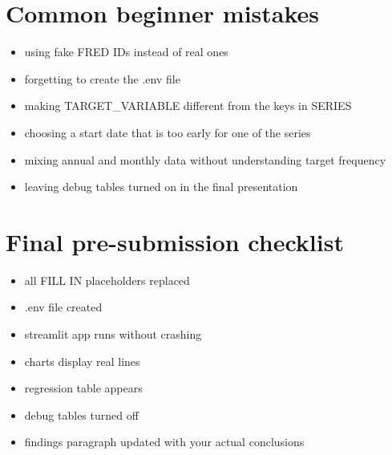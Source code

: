 \documentclass[11pt]{article}
\begin{document}
\section{Common beginner mistakes}
\begin{itemize}[leftmargin=1.5em]
  \item using fake FRED IDs instead of real ones
  \item forgetting to create the .env file
  \item making TARGET\_VARIABLE different from the keys in SERIES
  \item choosing a start date that is too early for one of the series
  \item mixing annual and monthly data without understanding target frequency
  \item leaving debug tables turned on in the final presentation
\end{itemize}

\section{Final pre-submission checklist}
\begin{itemize}[leftmargin=1.5em]
  \item all FILL IN placeholders replaced
  \item .env file created
  \item streamlit app runs without crashing
  \item charts display real lines
  \item regression table appears
  \item debug tables turned off
  \item findings paragraph updated with your actual conclusions
\end{itemize}
\end{document}
